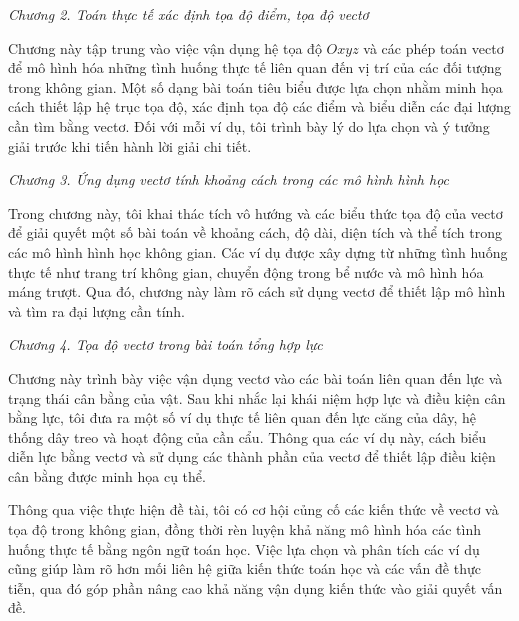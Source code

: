 \documentclass[12pt,a4paper,oneside]{book}
\theoremstyle{theorem}
\theoremstyle{definition}
\begin{document}
        \textit{Chương 2. Toán thực tế xác định tọa độ điểm, tọa độ vectơ}
        
        Chương này tập trung vào việc vận dụng hệ tọa độ $Oxyz$ và các phép toán vectơ để mô hình hóa những tình huống thực tế liên quan đến vị trí của các đối tượng trong không gian. Một số dạng bài toán tiêu biểu được lựa chọn nhằm minh họa cách thiết lập hệ trục tọa độ, xác định tọa độ các điểm và biểu diễn các đại lượng cần tìm bằng vectơ. Đối với mỗi ví dụ, tôi trình bày lý do lựa chọn và ý tưởng giải trước khi tiến hành lời giải chi tiết.
        
        \textit{Chương 3. Ứng dụng vectơ tính khoảng cách trong các mô hình hình học}
        
        Trong chương này, tôi khai thác tích vô hướng và các biểu thức tọa độ của vectơ để giải quyết một số bài toán về khoảng cách, độ dài, diện tích và thể tích trong các mô hình hình học không gian. Các ví dụ được xây dựng từ những tình huống thực tế như trang trí không gian, chuyển động trong bể nước và mô hình hóa máng trượt. Qua đó, chương này làm rõ cách sử dụng vectơ để thiết lập mô hình và tìm ra đại lượng cần tính.
        
        \textit{Chương 4. Tọa độ vectơ trong bài toán tổng hợp lực}
        
        Chương này trình bày việc vận dụng vectơ vào các bài toán liên quan đến lực và trạng thái cân bằng của vật. Sau khi nhắc lại khái niệm hợp lực và điều kiện cân bằng lực, tôi đưa ra một số ví dụ thực tế liên quan đến lực căng của dây, hệ thống dây treo và hoạt động của cần cẩu. Thông qua các ví dụ này, cách biểu diễn lực bằng vectơ và sử dụng các thành phần của vectơ để thiết lập điều kiện cân bằng được minh họa cụ thể.
        
        Thông qua việc thực hiện đề tài, tôi có cơ hội củng cố các kiến thức về vectơ và tọa độ trong không gian, đồng thời rèn luyện khả năng mô hình hóa các tình huống thực tế bằng ngôn ngữ toán học. Việc lựa chọn và phân tích các ví dụ cũng giúp làm rõ hơn mối liên hệ giữa kiến thức toán học và các vấn đề thực tiễn, qua đó góp phần nâng cao khả năng vận dụng kiến thức vào giải quyết vấn đề.
        
	
\end{document}

